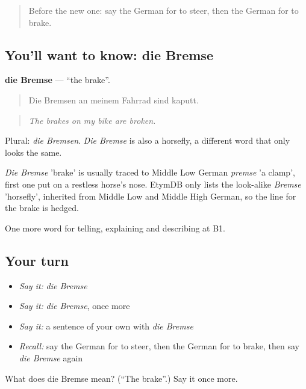 \begin{quote}
Before the new one: say the German for to steer, then the German for to brake.
\end{quote}

\subsection*{You'll want to know: die Bremse}
\textbf{die Bremse} — \textquotedblleft{}the brake\textquotedblright{}.

\begin{quote}
Die Bremsen an meinem Fahrrad sind kaputt.
\end{quote}

\begin{quote}
\emph{The brakes on my bike are broken.}
\end{quote}

Plural: \emph{die Bremsen}. \emph{Die Bremse} is also a horsefly, a different word that only looks the same.

\begin{cousinweb}
\emph{Die Bremse} 'brake' is usually traced to Middle Low German \emph{premse} 'a clamp', first one put on a restless horse's nose. EtymDB only lists the look-alike \emph{Bremse} 'horsefly', inherited from Middle Low and Middle High German, so the line for the brake is hedged.
\end{cousinweb}

\begin{grammarlens}[title={What you've built}]
One more word for telling, explaining and describing at B1.
\end{grammarlens}

\subsection*{Your turn}
\begin{itemize}
\raggedright
  \item \emph{Say it:} \emph{die Bremse}
  \item \emph{Say it:} \emph{die Bremse}, once more
  \item \emph{Say it:} a sentence of your own with \emph{die Bremse}
  \item \emph{Recall:} say the German for to steer, then the German for to brake, then say \emph{die Bremse} again
\end{itemize}

\begin{tcolorbox}[breakable,colback=teal!4,colframe=teal!35!black,title={Before you move on}]
What does die Bremse mean? (\textquotedblleft{}The brake\textquotedblright{}.) Say it once more.
\end{tcolorbox}
